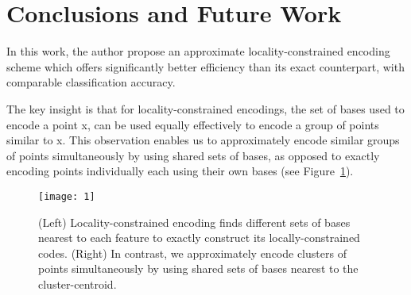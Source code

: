 \documentclass[10pt,twocolumn,letterpaper]{article}
\begin{document}
\section{Conclusions and Future Work}
In this work, the author propose an approximate locality-constrained\cite{Wang2010Locality} encoding scheme which offers significantly
better efficiency than its exact counterpart, with comparable
classification accuracy.

The key insight is that for locality-constrained encodings,
the set of bases used to encode a point x, can be used
equally effectively to encode a group of points similar to x.
This observation enables us to approximately encode similar
groups of points simultaneously by using shared sets of
bases, as opposed to exactly encoding points individually
each using their own bases (see Figure~\ref{fig:1}).
\begin{figure}
\centering
\texttt{[image: 1]}
\caption{(Left) Locality-constrained encoding\cite{Wang2010Locality} finds
different sets of bases nearest to each feature to exactly construct
its locally-constrained codes. (Right) In contrast, we
approximately encode clusters of points simultaneously by
using shared sets of bases nearest to the cluster-centroid.}
\label{fig:1}
\end{figure}

{\small


}
\end{document}
